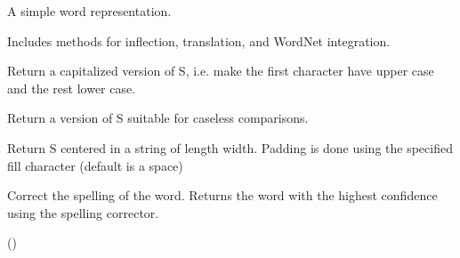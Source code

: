 \documentclass[letterpaper,10pt,english]{sphinxmanual}
\begin{document}
\begin{fulllineitems}
\label{api_reference:textblob_de.blob.Word}
A simple word representation.

Includes methods for inflection, translation, and WordNet
integration.

\begin{fulllineitems}
\label{api_reference:textblob_de.blob.Word.capitalize}
Return a capitalized version of S, i.e. make the first character
have upper case and the rest lower case.

\end{fulllineitems}


\begin{fulllineitems}
\label{api_reference:textblob_de.blob.Word.casefold}
Return a version of S suitable for caseless comparisons.

\end{fulllineitems}


\begin{fulllineitems}
\label{api_reference:textblob_de.blob.Word.center}
Return S centered in a string of length width. Padding is
done using the specified fill character (default is a space)

\end{fulllineitems}


\begin{fulllineitems}
\label{api_reference:textblob_de.blob.Word.correct}
Correct the spelling of the word. Returns the word with the highest
confidence using the spelling corrector.

()

\end{fulllineitems}


\end{fulllineitems}
\end{document}
